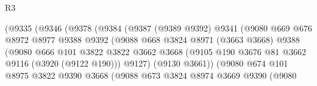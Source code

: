 \begin{lexlean}{R3}
\begin{coremodule}
                                (@9335
                                  (@9346
                                    (@9378
                                      (@9384
                                        (@9387
                                          (@9389 @9392)
                                          @9341
                                          (@9080
                                            @669
                                            @676
                                            @8972
                                            @8977
                                            @9388
                                            @9392
                                            (@9088
                                              @668
                                              @3824
                                              @8971
                                              (@3663 @3668)
                                              @9388
                                              (@9080
                                                @666
                                                @101
                                                @3822
                                                @3822
                                                @3662
                                                @3668
                                                (@9105
                                                  @190
                                                  @3676
                                                  @81
                                                  @3662
                                                  @9116
                                                  (@3920 (@9122 @190)))
                                                @9127)
                                              (@9130 @3661))
                                            (@9080
                                              @674
                                              @101
                                              @8975
                                              @3822
                                              @9390
                                              @3668
                                              (@9088
                                                @673
                                                @3824
                                                @8974
                                                @3669
                                                @9390
                                                (@9080

\end{coremodule}
\end{lexlean}
